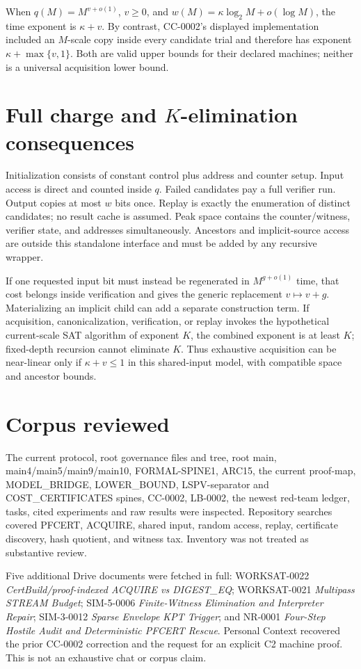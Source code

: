 \documentclass[11pt]{article}
\begin{document}
When $q(M)=M^{v+o(1)}$, $v\ge0$, and
$w(M)=\kappa\log_2M+o(\log M)$, the time exponent is $\kappa+v$.
By contrast, CC-0002's displayed implementation included an $M$-scale copy
inside every candidate trial and therefore has exponent
$\kappa+\max\{v,1\}$.  Both are valid upper bounds for their declared
machines; neither is a universal acquisition lower bound.

\section{Full charge and $K$-elimination consequences}
Initialization consists of constant control plus address and counter setup.
Input access is direct and counted inside $q$.  Failed candidates pay a full
verifier run.  Output copies at most $w$ bits once.  Replay is exactly the
enumeration of distinct candidates; no result cache is assumed.  Peak space
contains the counter/witness, verifier state, and addresses simultaneously.
Ancestors and implicit-source access are outside this standalone interface
and must be added by any recursive wrapper.

If one requested input bit must instead be regenerated in
$M^{g+o(1)}$ time, that cost belongs inside verification and gives the generic
replacement $v\mapsto v+g$.  Materializing an implicit child can add a
separate construction term.  If acquisition, canonicalization, verification,
or replay invokes the hypothetical current-scale SAT algorithm of exponent
$K$, the combined exponent is at least $K$; fixed-depth recursion cannot
eliminate $K$.  Thus exhaustive acquisition can be near-linear only if
$\kappa+v\le1$ in this shared-input model, with compatible space and ancestor
bounds.

\section{Corpus reviewed}
The current protocol, root governance files and tree, root main,
main4/main5/main9/main10, FORMAL-SPINE1, ARC15, the current proof-map,
MODEL\_BRIDGE, LOWER\_BOUND, LSPV-separator and COST\_CERTIFICATES spines,
CC-0002, LB-0002, the newest red-team ledger, tasks, cited experiments and
raw results were inspected.  Repository searches covered PFCERT, ACQUIRE,
shared input, random access, replay, certificate discovery, hash quotient,
and witness tax.  Inventory was not treated as substantive review.

Five additional Drive documents were fetched in full: WORKSAT-0022
\emph{CertBuild/proof-indexed ACQUIRE vs DIGEST\_EQ}; WORKSAT-0021
\emph{Multipass STREAM Budget}; SIM-5-0006 \emph{Finite-Witness Elimination
and Interpreter Repair}; SIM-3-0012 \emph{Sparse Envelope KPT Trigger}; and
NR-0001 \emph{Four-Step Hostile Audit and Deterministic PFCERT Rescue}.
Personal Context recovered the prior CC-0002 correction and the request for
an explicit C2 machine proof.  This is not an exhaustive chat or corpus claim.
\end{document}
